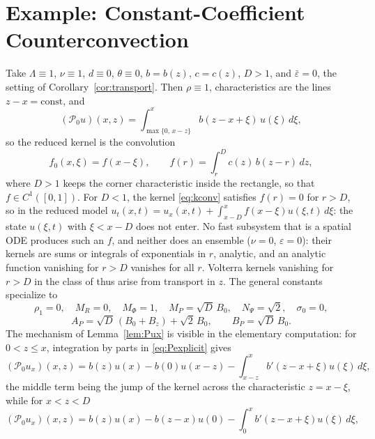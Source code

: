\documentclass[12pt]{article}
\theoremstyle{plain}
\theoremstyle{remark}
\newcommand{\PP}{\mathcal P}
\begin{document}
\section{Example: Constant-Coefficient Counterconvection}\label{sec:example}
Take $\Lambda\equiv1$, $\nu\equiv1$, $d\equiv0$, $\theta\equiv0$, $b=b(z)$, $c=c(z)$, $D>1$, and $\bar\varepsilon=0$, the setting of Corollary~\ref{cor:transport}. Then $\rho\equiv1$, characteristics are the lines $z-x=\mathrm{const}$, and
\begin{equation}
 (\PP_0 u)(x,z)=\int_{\max\{0,\,x-z\}}^{x}b(z-x+\xi)\,u(\xi)\,d\xi,
 \label{eq:Pexplicit}
\end{equation}
so the reduced kernel is the convolution
\begin{equation}
 f_0(x,\xi)=f(x-\xi),
 \qquad
 f(r)=\int_r^Dc(z)\,b(z-r)\,dz ,
 \label{eq:kconv}
\end{equation}
where $D>1$ keeps the corner characteristic inside the rectangle, so that $f\in C^1([0,1])$. For $D<1$, the kernel \eqref{eq:kconv} satisfies $f(r)=0$ for $r>D$, so in the reduced model $u_t(x,t)=u_x(x,t)+\int_{x-D}^xf(x-\xi)u(\xi,t)\,d\xi$: the state $u(\xi,t)$ with $\xi<x-D$ does not enter. No fast subsystem that is a spatial ODE produces such an $f$, and neither does an ensemble ($\nu=0$, $\varepsilon=0$): their kernels are sums or integrals of exponentials in $r$, analytic, and an analytic function vanishing for $r>D$ vanishes for all $r$. Volterra kernels vanishing for $r>D$ in the class of \cite{KrsticSmyshlyaev2008} thus arise from transport in $z$. The general constants specialize to
\begin{equation}
 \rho_1=0,\quad M_R=0,\quad M_\Phi=1,\quad
 M_P=\sqrt D\,B_0,\quad
 N_\Psi=\sqrt2,\quad
 \sigma_0=0,
 \label{eq:exconst1}
\end{equation}
\begin{equation}
 A_P=\sqrt D\,(B_0+B_z)+\sqrt2\,B_0,
 \qquad
 B_P=\sqrt D\,B_0 .
 \label{eq:exconst2}
\end{equation}
The mechanism of Lemma~\ref{lem:Pux} is visible in the elementary computation: for $0<z\le x$, integration by parts in \eqref{eq:Pexplicit} gives
\begin{equation}
 (\PP_0 u_x)(x,z)=b(z)u(x)-b(0)u(x-z)-\int_{x-z}^xb'(z-x+\xi)u(\xi)\,d\xi,
 \label{eq:excase1}
\end{equation}
the middle term being the jump of the kernel across the characteristic $z=x-\xi$, while for $x<z<D$
\begin{equation}
 (\PP_0 u_x)(x,z)=b(z)u(x)-b(z-x)u(0)-\int_0^xb'(z-x+\xi)u(\xi)\,d\xi,
 \label{eq:excase2}
\end{equation}
\end{document}
